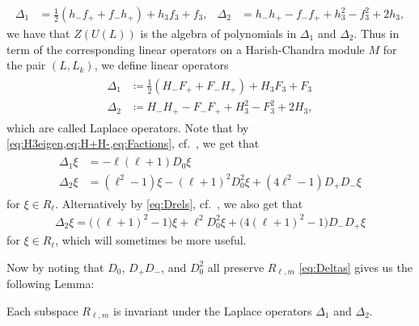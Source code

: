 \begin{align*}
  \Delta_1 &= \tfrac{1}{2}(h_-f_++f_-h_+)+h_3f_3+f_3, & \Delta_2 &= h_-h_+ - f_-f_+ + h_3^2 - f_3^2 + 2h_3,
\end{align*}
we have that $Z(U(L))$ is the algebra of polynomials in $\Delta_1$ and $\Delta_2$. Thus in term of the corresponding linear operators on a Harish-Chandra module $M$ for the pair $(L,L_k)$, we define linear operators
\begin{align}\label{eq:Deltasdef}
  \begin{aligned}
    \Delta_1 &\coloneqq \tfrac{1}{2}(H_-F_++F_-H_+) + H_3F_3 + F_3 \\
    \Delta_2 &\coloneqq H_-H_+ - F_-F_+ + H_3^2 - F_3^2 + 2H_3,
  \end{aligned}
\end{align}
which are called Laplace operators. Note that by \cref{eq:H3eigen,eq:H+H-,eq:Factions}, cf.\ , we get that
\begin{align}\label{eq:Deltas}
  \begin{aligned}
    \Delta_1 \xi &= -\ell(\ell+1)D_0\xi \\
    \Delta_2 \xi &= (\ell^2-1)\xi - (\ell+1)^2D_0^2\xi + (4\ell^2-1)D_+D_-\xi
  \end{aligned}                 
\end{align}
for $\xi\in R_\ell$. Alternatively by \cref{eq:Drels}, cf.\ , we also get that
\begin{align}\label{eq:altDelta2}
  \Delta_2 \xi = \bigl((\ell+1)^2-1\bigr)\xi  + \ell^2D_0^2\xi + \bigl(4(\ell+1)^2-1\bigr)D_-D_+\xi
\end{align}
for $\xi\in R_\ell$, which will sometimes be more useful.

Now by noting that $D_0$, $D_+D_-$, and $D_0^2$ all preserve $R_{\ell,m}$ \cref{eq:Deltas} gives us the following Lemma:
\begin{lemma}\label{lem:R_lmDeltainvariant}
  Each subspace $R_{\ell,m}$ is invariant under the Laplace operators $\Delta_1$ and $\Delta_2$. 
\end{lemma}

